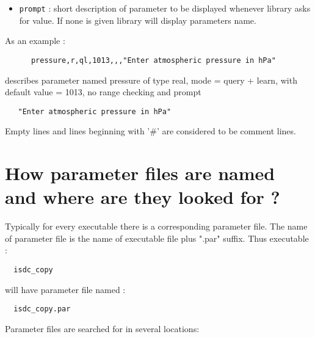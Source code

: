 \begin{itemize}
\item
{\tt prompt} : short description of parameter to be displayed whenever
library asks for value. If none is given library will display parameters name. 

\end{itemize}

As an example :

\begin{verbatim}
      pressure,r,ql,1013,,,"Enter atmospheric pressure in hPa" 
\end{verbatim}

describes parameter named pressure of type real, mode = query + learn, with
default value = 1013, no range checking and prompt

\begin{verbatim}
   "Enter atmospheric pressure in hPa" 
\end{verbatim}

Empty lines and lines beginning with '\#' are considered to be comment lines. 

\section{How parameter files are named and where are they looked for ?}\label{PILRefWhereFiles}

Typically for every executable there is a corresponding parameter file. The
name of parameter file is the name of executable file plus ".par" suffix.
Thus executable :

\begin{verbatim}
  isdc_copy
\end{verbatim}

will have parameter file named :

\begin{verbatim}
  isdc_copy.par
\end{verbatim}

Parameter files are searched for in several locations: 


